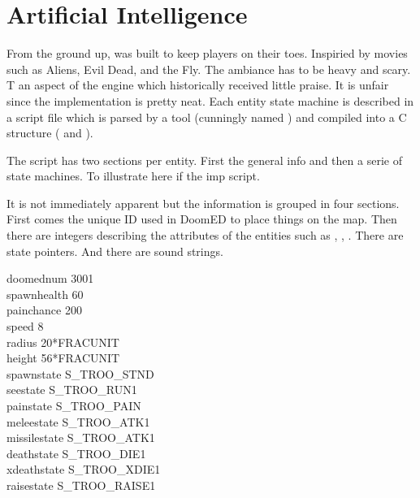\section{Artificial Intelligence}
From the ground up, \doom was built to keep players on their toes. Inspiried by movies such as Aliens, Evil Dead, and the Fly. The ambiance has to be heavy and scary. T an aspect of the engine which historically received little praise. It is unfair since the implementation is pretty neat. Each entity state machine is described in a script file  which is parsed by a tool (cunningly named ) and compiled into a C structure ( and ).\\
\par
{}
\par
The script has two sections per entity. First the general info and then a serie of state machines. To illustrate here if the imp script.\\
\par
{}
\par
It is not immediately apparent but the information is grouped in four sections. First comes the unique ID used in DoomED to place things on the map. Then there are integers describing the attributes of the entities such as , , . There are state pointers. And there are sound strings.\\
\par
doomednum        3001\\

spawnhealth        60\\
painchance        200\\
speed            8\\
radius            20*FRACUNIT\\
height            56*FRACUNIT\\

spawnstate        S\_TROO\_STND\\
seestate        S\_TROO\_RUN1\\
painstate        S\_TROO\_PAIN\\
meleestate        S\_TROO\_ATK1\\
missilestate    S\_TROO\_ATK1\\
deathstate        S\_TROO\_DIE1\\
xdeathstate        S\_TROO\_XDIE1\\
raisestate        S\_TROO\_RAISE1\\

